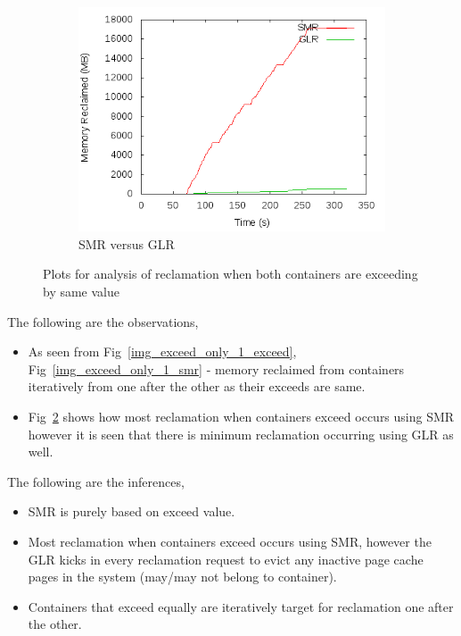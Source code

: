 \begin{figure}[t!]
\begin{subfigure}[t]{0.48\textwidth}
	      \centering
	      \includegraphics[width=1\textwidth]{images/controller_issues/exceed_only/compare.png}
	      \caption{SMR versus GLR}
	    \label{img_exceed_only_1_compare}
	    \end{subfigure}
	    \caption{Plots for analysis of reclamation when both containers are exceeding by same value}
	  \end{figure}
	  
	    The following are the observations,
	    \begin{itemize}
	      \item As seen from Fig~\ref{img_exceed_only_1_exceed}, Fig~\ref{img_exceed_only_1_smr} - memory reclaimed from containers 
  iteratively from one after the other as their exceeds are same.
	      \item Fig~\ref{img_exceed_only_1_compare} shows how most reclamation when containers exceed occurs using SMR however it is seen 
  that there is minimum reclamation occurring using GLR as well.
	    \end{itemize}

	    The following are the inferences,
	    \begin{itemize}
	      \item SMR is purely based on exceed value.
	      \item Most reclamation when containers exceed occurs using SMR, however the GLR kicks in every reclamation request to evict any 
  inactive page cache pages in the system (may/may not belong to container).
	      \item Containers that exceed equally are iteratively target for reclamation one after the other.
	    \end{itemize}
      
